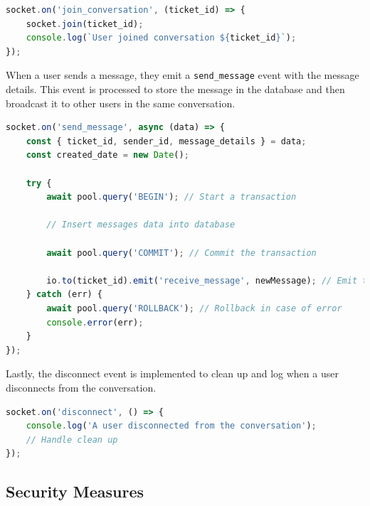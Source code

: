 \begin{lstlisting}[language=Javascript, breaklines=true, caption=Socket.io join\_conversation event]
socket.on('join_conversation', (ticket_id) => {
	socket.join(ticket_id);
	console.log(`User joined conversation ${ticket_id}`);
});
\end{lstlisting}	

When a user sends a message, they emit a \texttt{send\_message} event with the message details. This event is processed to store the message in the database and then broadcast it to other users in the same conversation.


\begin{lstlisting}[language=Javascript, breaklines=true, caption=Socket.io send\_message event]
socket.on('send_message', async (data) => {
	const { ticket_id, sender_id, message_details } = data;
	const created_date = new Date();
	
	try {
		await pool.query('BEGIN'); // Start a transaction
		
		// Insert messages data into database
		
		await pool.query('COMMIT'); // Commit the transaction
		
		io.to(ticket_id).emit('receive_message', newMessage); // Emit the new message to the room
	} catch (err) {
		await pool.query('ROLLBACK'); // Rollback in case of error
		console.error(err);
	}
});

\end{lstlisting}	

Lastly, the disconnect event is implemented to clean up and log when a user disconnects from the conversation.
\begin{lstlisting}[language=Javascript, breaklines=true, caption=Socket.io disconnect event]
socket.on('disconnect', () => {
	console.log('A user disconnected from the conversation');
	// Handle clean up
});
\end{lstlisting}


\subsection{Security Measures}


	
	
	